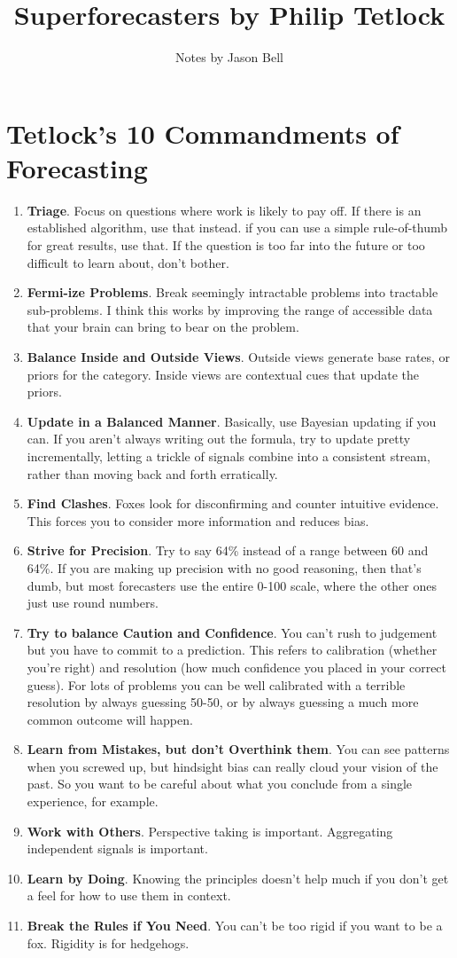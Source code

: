 \documentclass[11pt]{amsart}
\title{Superforecasters by Philip Tetlock}
\author{Notes by Jason Bell}
\begin{document}
\maketitle
\section{Tetlock's 10 Commandments of Forecasting}
\begin{enumerate}
\item \textbf{Triage}.  Focus on questions where work is likely to pay off.  If there is an established algorithm, use that instead.  if you can use a simple rule-of-thumb for great results, use that.  If the question is too far into the future or too difficult to learn about, don't bother.  
\item \textbf{Fermi-ize Problems}.  Break seemingly intractable problems into tractable sub-problems.  I think this works by improving the range of accessible data that your brain can bring to bear on the problem.
\item \textbf{Balance Inside and Outside Views}.  Outside views generate base rates, or priors for the category.  Inside views are contextual cues that update the priors.
\item \textbf{Update in a Balanced Manner}.  Basically, use Bayesian updating if you can.  If you aren't always writing out the formula, try to update pretty incrementally, letting a trickle of signals combine into a consistent stream, rather than moving back and forth erratically.
\item \textbf{Find Clashes}.  Foxes look for disconfirming and counter intuitive evidence.  This forces you to consider more information and reduces bias.
\item \textbf{Strive for Precision}.  Try to say 64\% instead of a range between 60 and 64\%.  If you are making up precision with no good reasoning, then that's dumb, but most forecasters use the entire 0-100 scale, where the other ones just use round numbers.
\item \textbf{Try to balance Caution and Confidence}.  You can't rush to judgement but you have to commit to a prediction.  This refers to calibration (whether you're right) and resolution (how much confidence you placed in your correct guess).  For lots of problems you can be well calibrated with a terrible resolution by always guessing 50-50, or by always guessing a much more common outcome will happen.  
\item \textbf{Learn from Mistakes, but don't Overthink them}.  You can see patterns when you screwed up, but hindsight bias can really cloud your vision of the past.  So you want to be careful about what you conclude from a single experience, for example.  
\item \textbf{Work with Others}.  Perspective taking is important.  Aggregating independent signals is important.
\item \textbf{Learn by Doing}.  Knowing the principles doesn't help much if you don't get a feel for how to use them in context.
\item \textbf{Break the Rules if You Need}.  You can't be too rigid if you want to be a fox.  Rigidity is for hedgehogs.
\end{enumerate}
\end{document}
